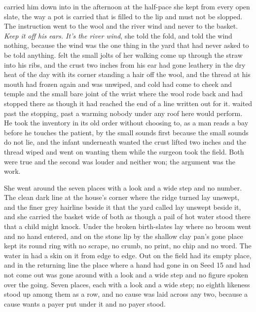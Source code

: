  carried him down into  in the afternoon at the half-pace she kept from every open slate, the way a pot is carried that is filled to the lip and must not be slopped. The instruction went to the wool and the river wind and never to the basket. \emph{Keep it off his ears. It's the river wind}, she told the fold, and told the wind nothing, because the wind was the one thing in the yard that had never asked to be told anything.  felt the small jolts of her walking come up through the straw into his ribs, and the crust two inches from his ear had gone leathery in the dry heat of the day with its corner standing a hair off the wool, and the thread at his mouth had frozen again and was unwiped, and cold had come to cheek and temple and the small bare joint of the wrist where the wool rode back and had stopped there as though it had reached the end of a line written out for it.  waited past the stopping, past a warming nobody under any roof here would perform. He took the inventory in its old order without choosing to, as a man reads a bay before he touches the patient, by the small sounds first because the small sounds do not lie, and the infant underneath wanted the crust lifted two inches and the thread wiped and went on wanting them while the surgeon took the field. Both were true and the second was louder and neither won; the argument was the work.

She went around the seven places with a look and a wide step and no number. The clean dark line at the house's corner where the  ridge turned lay unswept, and the finer grey hairline beside it that the yard called  lay unswept beside it, and she carried the basket wide of both as though a pail of hot water stood there that a child might knock. Under  the broken birth-slates lay where no broom went and no hand entered, and on the stone lip by  the shallow clay pan's gone place kept its round ring with no scrape, no crumb, no print, no chip and no word. The water in  had a skin on it from edge to edge. Out on  the field had its empty place, and in the returning line the place where a hand had gone in on Seed 15 and had not come out was gone around with a look and a wide step and no figure spoken over the going. Seven places, each with a look and a wide step; no eighth likeness stood up among them as a row, and no cause was laid across any two, because a cause wants a payer put under it and no payer stood.

